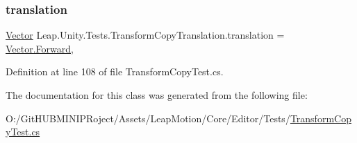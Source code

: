\subsubsection{\texorpdfstring{translation}{translation}}
{\footnotesize\ttfamily \mbox{\hyperlink{struct_leap_1_1_vector}{Vector}} Leap.\+Unity.\+Tests.\+Transform\+Copy\+Translation.\+translation = \mbox{\hyperlink{struct_leap_1_1_vector_a2ec88fe91f8086e18e78ee2dcc078525}{Vector.\+Forward}}\hspace{0.3cm}{\ttfamily [static]}, {\ttfamily [protected]}}



Definition at line 108 of file Transform\+Copy\+Test.\+cs.



The documentation for this class was generated from the following file\+:\begin{DoxyCompactItemize}
\item 
O\+:/\+Git\+H\+U\+B\+M\+I\+N\+I\+P\+Roject/\+Assets/\+Leap\+Motion/\+Core/\+Editor/\+Tests/\mbox{\hyperlink{_transform_copy_test_8cs}{Transform\+Copy\+Test.\+cs}}\end{DoxyCompactItemize}
